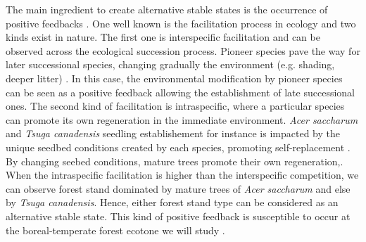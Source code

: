 The main ingredient to create alternative stable states is the occurrence of
positive feedbacks \cite{scheffer2009critical,Schroder2005}. One well known is
the facilitation process in ecology and two kinds exist in nature. The first
one is interspecific facilitation and can be observed across the ecological
succession process. Pioneer species pave the way for later successional
species, changing gradually the environment (e.g. shading, deeper litter)
\cite{scheffer2009critical, Levine2006}. In this case, the environmental
modification by pioneer species can be seen as a positive feedback allowing
the establishment of late successional ones.  The second kind of facilitation
is intraspecific, where a particular species can promote its own regeneration
in the immediate environment. \textit{Acer saccharum} and \textit{Tsuga
canadensis} seedling establishement for instance is impacted by the unique
seedbed conditions created by each species, promoting self-replacement
\cite{Society2014,McCarthyNeumann2012}. By changing seebed conditions, mature
trees promote their own regeneration,. When the intraspecific facilitation is
higher than the interspecific competition, we can observe forest stand
dominated by mature trees of \textit{Acer saccharum} and else by \textit{Tsuga
canadensis}. Hence, either forest stand type can be considered as an
alternative stable state. This kind of positive feedback is susceptible to
occur at the boreal-temperate forest ecotone we will study
\cite{Barras1998,Society2014}. \\



